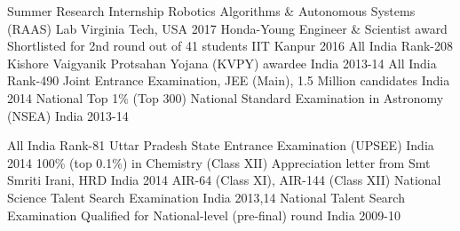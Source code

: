 \begin{cvhonors}
  \cvhonor
  	{Summer Research Internship}
    {Robotics Algorithms \& Autonomous Systems (RAAS) Lab}
    {Virginia Tech, USA}
    {2017}
  \cvhonor
    {Honda-Young Engineer \& Scientist award}
    {Shortlisted for 2nd round out of 41 students}
    {IIT Kanpur}
    {2016}
  \cvhonor
    {All India Rank-208}
    {Kishore Vaigyanik Protsahan Yojana (KVPY) awardee}
    {India}
    {2013-14}
  \cvhonor
    {All India Rank-490}%
    {Joint Entrance Examination, JEE (Main), 1.5 Million candidates}
    {India}
    {2014}
  \cvhonor
    {National Top 1\% (Top 300)}
    {National Standard Examination in Astronomy (NSEA)}%
    {India}
    {2013-14}

  \cvhonor
    {All India Rank-81}
    {Uttar Pradesh State Entrance Examination (UPSEE)}
    {India}
    {2014}
  \cvhonor
    {100\% (top 0.1\%) in Chemistry (Class XII)}
    {Appreciation letter from Smt Smriti Irani, HRD}%
    {India}
    {2014}
  \cvhonor
    {AIR-64 (Class XI), AIR-144 (Class XII)}
    {National Science Talent Search Examination}%
    {India}
    {2013,14}
  \cvhonor
    {National Talent Search Examination}
    {Qualified for National-level (pre-final) round}
    {India}
    {2009-10}
\end{cvhonors}
